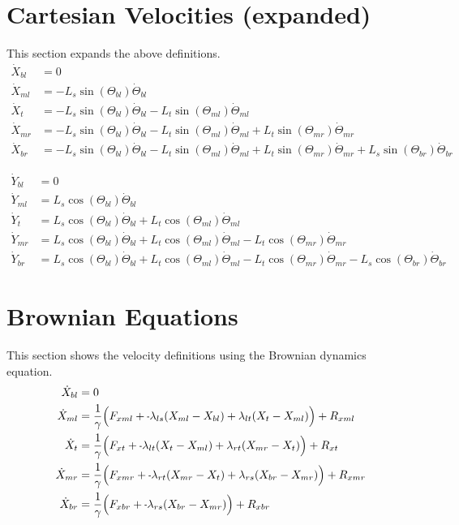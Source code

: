 \documentclass[11pt, landscape]{article}
\newcommand{\mn}{\scalebox{0.7}[1.0]{-}}
\begin{document}
\section{Cartesian Velocities (expanded)}
This section expands the above definitions. \\
\begin{align}
  \dot{X}_{bl} &= 0 \\
  \dot{X}_{ml} &= - L_{s}\sin(\Theta_{bl})\dot{\Theta}_{bl} \\
  \dot{X}_{t } &= - L_{s}\sin(\Theta_{bl})\dot{\Theta}_{bl} - L_{t}\sin(\Theta_{ml})\dot{\Theta}_{ml} \\
  \dot{X}_{mr} &= - L_{s}\sin(\Theta_{bl})\dot{\Theta}_{bl} - L_{t}\sin(\Theta_{ml})\dot{\Theta}_{ml} + L_{t}\sin(\Theta_{mr})\dot{\Theta}_{mr} \\
  \dot{X}_{br} &= - L_{s}\sin(\Theta_{bl})\dot{\Theta}_{bl} - L_{t}\sin(\Theta_{ml})\dot{\Theta}_{ml} + L_{t}\sin(\Theta_{mr})\dot{\Theta}_{mr} + L_{s}\sin(\Theta_{br})\dot{\Theta}_{br}
\end{align}             
             
\begin{align}                                                                               
  \dot{Y}_{bl} &= 0 \\                                                               
  \dot{Y}_{ml} &= L_{s}\cos(\Theta_{bl})\dot{\Theta}_{bl} \\
  \dot{Y}_{t}  &= L_{s}\cos(\Theta_{bl})\dot{\Theta}_{bl} + L_{t}\cos(\Theta_{ml})\dot{\Theta}_{ml} \\
  \dot{Y}_{mr} &= L_{s}\cos(\Theta_{bl})\dot{\Theta}_{bl} + L_{t}\cos(\Theta_{ml})\dot{\Theta}_{ml} - L_{t}\cos(\Theta_{mr})\dot{\Theta}_{mr} \\
  \dot{Y}_{br} &= L_{s}\cos(\Theta_{bl})\dot{\Theta}_{bl} + L_{t}\cos(\Theta_{ml})\dot{\Theta}_{ml} - L_{t}\cos(\Theta_{mr})\dot{\Theta}_{mr} - L_{s}\cos(\Theta_{br})\dot{\Theta}_{br}
\end{align}


\section{Brownian Equations}
This section shows the velocity definitions using the Brownian dynamics equation. \\
\begin{align}  
  \dot{X}_{bl} &= 0 \\
  \dot{X}_{ml} &= \frac{1}{\gamma} \Big(F_{xml} + \mn \lambda_{ls}(X_{ml} - X_{bl}) + \lambda_{lt}(X_{t } - X_{ml}) \Big) + R_{xml} \\
  \dot{X}_{t } &= \frac{1}{\gamma} \Big(F_{xt } + \mn \lambda_{lt}(X_{t } - X_{ml}) + \lambda_{rt}(X_{mr} - X_{t }) \Big) + R_{xt } \\
  \dot{X}_{mr} &= \frac{1}{\gamma} \Big(F_{xmr} + \mn \lambda_{rt}(X_{mr} - X_{t }) + \lambda_{rs}(X_{br} - X_{mr}) \Big) + R_{xmr} \\
  \dot{X}_{br} &= \frac{1}{\gamma} \Big(F_{xbr} + \mn \lambda_{rs}(X_{br} - X_{mr})                                 \Big) + R_{xbr}
\end{align}
\end{document}
